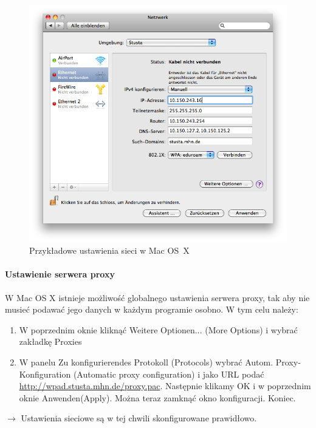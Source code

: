 \documentclass[a4paper,12pt]{scrartcl}
\begin{document}
\begin{enumerate}
\begin{figure}[h!]
\begin{minipage}[c]{0.38\linewidth}
        \end{minipage}
        \begin{minipage}[c]{0.60\linewidth}
          \centering
          \includegraphics[width=\linewidth,keepaspectratio]{Bilder/IP_MAC}
          \caption{Przykładowe ustawienia sieci w Mac OS~X}
        \end{minipage}
      \end{figure}
\end{enumerate}

\paragraph*{Ustawienie serwera proxy}
W Mac OS X istnieje możliwość globalnego ustawienia serwera proxy, tak aby nie musieć podawać jego danych w każdym programie osobno. W tym celu należy:
\begin{enumerate}
    \item W poprzednim oknie kliknąć Weitere Optionen... (More Options) i wybrać zakładkę Proxies
    \item W panelu Zu konfigurierendes Protokoll (Protocols) wybrać Autom. Proxy-Konfiguration (Automatic proxy configuration) i jako URL podać \url{http://wpad.stusta.mhn.de/proxy.pac}. Następnie klikamy OK i w poprzednim oknie Anwenden(Apply). Można teraz zamknąć okno konfiguracji. Koniec.
\end{enumerate}
$\rightarrow$ Ustawienia sieciowe są w tej chwili skonfigurowane prawidłowo. 
\end{document}

